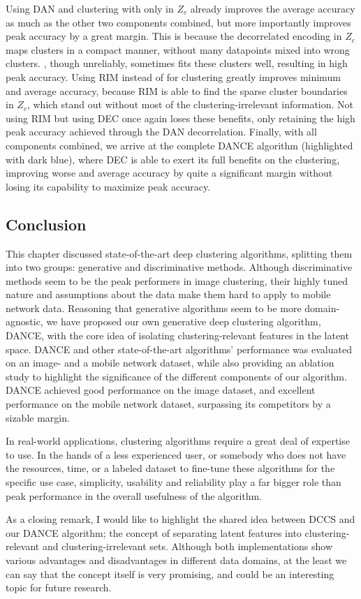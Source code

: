 			Using \ac{DAN} and clustering with \kmeans{} only in $Z_c$ already improves the average accuracy as much as the other two components combined, but more importantly improves peak accuracy by a great margin.
			This is because the decorrelated encoding in $Z_c$ maps clusters in a compact manner, without many datapoints mixed into wrong clusters.
			\kmeans{}, though unreliably, sometimes fits these clusters well, resulting in high peak accuracy.
			Using \ac{RIM} instead of \kmeans{} for clustering greatly improves minimum and average accuracy, because \ac{RIM} is able to find the sparse cluster boundaries in $Z_c$, which stand out without most of the clustering-irrelevant information.
			Not using \ac{RIM} but using \ac{DEC} once again loses these benefits, only retaining the high peak accuracy achieved through the \ac{DAN} decorrelation.
			Finally, with all components combined, we arrive at the complete \ac{DANCE} algorithm (highlighted with dark blue), where \ac{DEC} is able to exert its full benefits on the clustering, improving worse and average accuracy by quite a significant margin without losing its capability to maximize peak accuracy.
			
		\subsection{Conclusion}
			
			This chapter discussed state-of-the-art deep clustering algorithms, splitting them into two groups: generative and discriminative methods.
			Although discriminative methods seem to be the peak performers in image clustering, their highly tuned nature and assumptions about the data make them hard to apply to mobile network data.
			Reasoning that generative algorithms seem to be more domain-agnostic, we have proposed our own generative deep clustering algorithm, \ac{DANCE}, with the core idea of isolating clustering-relevant features in the latent space.
			\ac{DANCE} and other state-of-the-art algorithms' performance was evaluated on an image- and a mobile network dataset, while also providing an ablation study to highlight the significance of the different components of our algorithm.
			\ac{DANCE} achieved good performance on the image dataset, and excellent performance on the mobile network dataset, surpassing its competitors by a sizable margin.
			
			In real-world applications, clustering algorithms require a great deal of expertise to use. 
			In the hands of a less experienced user, or somebody who does not have the resources, time, or a labeled dataset to fine-tune these algorithms for the specific use case, simplicity, usability and reliability play a far bigger role than peak performance in the overall usefulness of the algorithm.
			
			As a closing remark, I would like to highlight the shared idea between \ac{DCCS} and our \ac{DANCE} algorithm; the concept of separating latent features into clustering-relevant and clustering-irrelevant sets.
			Although both implementations show various advantages and disadvantages in different data domains, at the least we can say that the concept itself is very promising, and could be an interesting topic for future research.		

			
